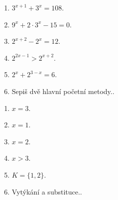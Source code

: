 \documentclass[11pt,a4paper]{article}
\begin{document}
\begin{zadaniReseniBox}[title={Domácí úkol}]
\begin{enumerate}[label=\alph*)]
\item $3^{x+1}+3^x=108$.
\item $9^x+2\cdot3^x-15=0$.
\item $2^{x+2}-2^x=12$.
\item $2^{2x-1}>2^{x+2}$.
\item $2^x+2^{3-x}=6$.
\item Sepiš dvě hlavní početní metody..
\end{enumerate}
\tcblower
\begin{enumerate}[label=\alph*)]
\item $x=3$.
\item $x=1$.
\item $x=2$.
\item $x>3$.
\item $K=\{1,2\}$.
\item Vytýkání a substituce..
\end{enumerate}
\end{zadaniReseniBox}
\end{document}
